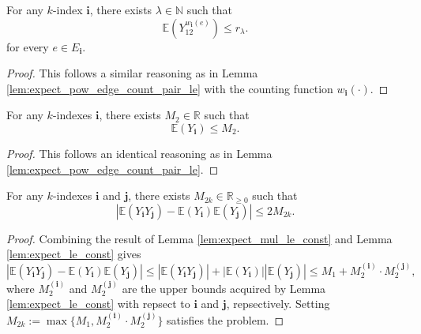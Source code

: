 \begin{lemma}
  \notready
  \label{lem:expect_pow_edge_count_le_off}
  For any $k$-index $\mathbf{i}$, there exists $\lambda \in \mathbb{N}$ such that
  \[
  \mathbb{E} (Y_{12}^{w_{\mathbf{i}}(e)}) \leq r_\lambda.
  \]
  for every $e \in E_\mathbf{i}$.
\end{lemma}

\begin{proof}
  This follows a similar reasoning as in Lemma \ref{lem:expect_pow_edge_count_pair_le} with the counting function $w_\mathbf{i}(\cdot)$.
\end{proof}


\begin{lemma}
  \notready
  \label{lem:expect_le_const}
  For any $k$-indexes $\mathbf{i}$, there exists $M_2 \in \mathbb{R}$ such that
  \[
  \mathbb{E} (Y_\mathbf{i}) \leq M_2.
  \]
\end{lemma}

\begin{proof}
  This follows an identical reasoning as in Lemma \ref{lem:expect_pow_edge_count_pair_le}.
\end{proof}


\begin{lemma}
  \notready
  \label{lem:abs_expect_mul_sub_mul_expect_le}
  For any $k$-indexes $\mathbf{i}$ and $\mathbf{j}$, there exists $M_{2k} \in \mathbb{R}_{\geq 0}$ such that
  \[
  | \mathbb{E} (Y_\mathbf{i}Y_\mathbf{j}) -  \mathbb{E}(Y_\mathbf{i}) \mathbb{E}(Y_\mathbf{j}) |
  \leq 2 M_{2k}.
  \]
\end{lemma}

\begin{proof}
  Combining the result of Lemma \ref{lem:expect_mul_le_const} and Lemma \ref{lem:expect_le_const} gives
  \[
  | \mathbb{E} (Y_\mathbf{i}Y_\mathbf{j}) -  \mathbb{E}(Y_\mathbf{i}) \mathbb{E}(Y_\mathbf{j}) |
  \leq | \mathbb{E} (Y_\mathbf{i}Y_\mathbf{j}) | + | \mathbb{E}(Y_\mathbf{i})| | \mathbb{E}(Y_\mathbf{j}) |
  \leq M_1 + M_2^{(\mathbf{i})} \cdot M_2^{(\mathbf{j})},
  \]
  where $M_2^{(\mathbf{i})}$ and $M_2^{(\mathbf{j})}$ are the upper bounds acquired by Lemma \ref{lem:expect_le_const} with repsect to $\mathbf{i}$ and $\mathbf{j}$, repsectively.
  Setting $M_{2k} := \max\{ M_1, M_2^{(\mathbf{i})} \cdot M_2^{(\mathbf{j})} \}$ satisfies the problem.
\end{proof}


